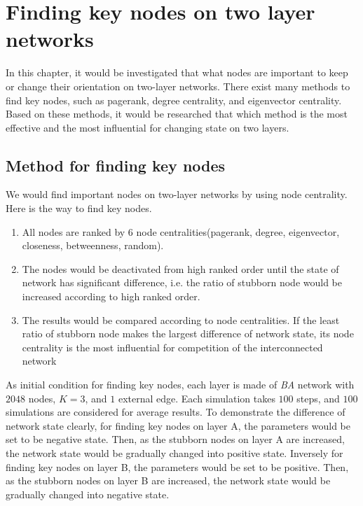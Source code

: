 
\chapter{Finding key nodes on two layer networks}
\label{chap:finding key nodes on two layer networks}
In this chapter, it would be investigated that what nodes are important to keep or change their orientation on two-layer networks. There exist many methods to find key nodes, such as pagerank, degree centrality, and eigenvector centrality. Based on these methods, it would be researched that which method is the most effective and the most influential for changing state on two layers.  

\section{Method for finding key nodes}
We would find important nodes on two-layer networks by using node centrality. Here is the way to find key nodes.
\begin{enumerate}
	\item All nodes are ranked by 6 node centralities(pagerank, degree, eigenvector, closeness, betweenness, random).
	\item The nodes would be deactivated from high ranked order until the state of network has significant difference, i.e. the ratio of stubborn node would be increased according to high ranked order. 
	\item The results would be compared according to node centralities. If the least ratio of stubborn node makes the largest difference of network state, its node centrality is the most influential for competition of the interconnected network
\end{enumerate}

As initial condition for finding key nodes, each layer is made of \textit{BA} network with $2048$ nodes, $K=3$, and $1$ external edge. Each simulation takes $100$ steps, and $100$ simulations are considered for average results. To demonstrate the difference of network state clearly, for finding key nodes on layer A, the parameters would be set to be negative state. Then, as the stubborn nodes on layer A are increased, the network state would be gradually changed into positive state.  Inversely for finding key nodes on layer B, the parameters would be set to be positive. Then, as the stubborn nodes on layer B are increased, the network state would be gradually changed into negative state.   

